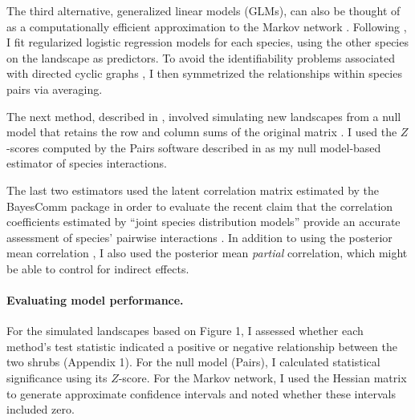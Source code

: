 The third alternative, generalized linear models (GLMs), can also be
thought of as a computationally efficient approximation to the Markov
network \citep{lee_learning_2012}. Following
\citet{faisal_inferring_2010}, I fit regularized logistic regression
models \citep{gelman_weakly_2008} for each species, using the other
species on the landscape as predictors. To avoid the identifiability
problems associated with directed cyclic graphs
\citep{schmidt_modeling_2012}, I then symmetrized the relationships
within species pairs via averaging.

The next method, described in \citet{gotelli_empirical_2009}, involved
simulating new landscapes from a null model that retains the row and
column sums of the original matrix \citep{strong_ecological_1984}. I
used the \(Z\)-scores computed by the Pairs software described in
\citet{gotelli_empirical_2009} as my null model-based estimator of
species interactions.

The last two estimators used the latent correlation matrix estimated by
the BayesComm package \citep{golding_bayescomm_2015} in order to
evaluate the recent claim that the correlation coefficients estimated by
``joint species distribution models'' provide an accurate assessment of
species' pairwise interactions
\citetext{\citealp{pollock_understanding_2014}; \citealp[see
also][]{harris_generating_2015}}. In addition to using the posterior
mean correlation \citep{pollock_understanding_2014}, I also used the
posterior mean \emph{partial} correlation, which might be able to
control for indirect effects.

\paragraph{Evaluating model
performance.}\label{evaluating-model-performance.}

For the simulated landscapes based on Figure 1, I assessed whether each
method's test statistic indicated a positive or negative relationship
between the two shrubs (Appendix 1). For the null model (Pairs), I
calculated statistical significance using its \(Z\)-score. For the
Markov network, I used the Hessian matrix to generate approximate
confidence intervals and noted whether these intervals included zero.

